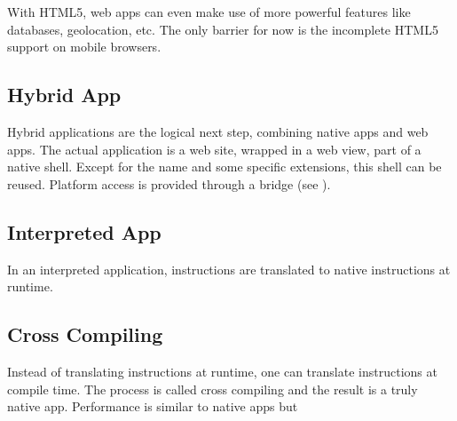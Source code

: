 \npar With HTML5, web apps can even make use of more powerful features like databases, geolocation, etc. The only barrier for now is the incomplete HTML5 support on mobile browsers.

\subsection{Hybrid App}

\npar Hybrid applications are the logical next step, combining native apps and web apps. The actual application is a web site, wrapped in a web view, part of a native shell. Except for the name and some specific extensions, this shell can be reused. Platform access is provided through a bridge (see ). 

\begin{figure}
    \begin{center}
        \label{fig:hybrid}
        \caption{}
    \end{center}
\end{figure}

\npar

\subsection{Interpreted App}

\npar In an interpreted application, instructions are translated to native instructions at runtime.

\begin{figure}
    \begin{center}
        \label{fig:interpreted}
        \caption{}
    \end{center}
\end{figure}

\subsection{Cross Compiling}

\npar Instead of translating instructions at runtime, one can translate instructions at compile time. The process is called cross compiling and the result is a truly native app. Performance is similar to native apps but 

\begin{figure}
    \begin{center}
        \label{fig:crosscompiled}
        \caption{}
    \end{center}
\end{figure}

